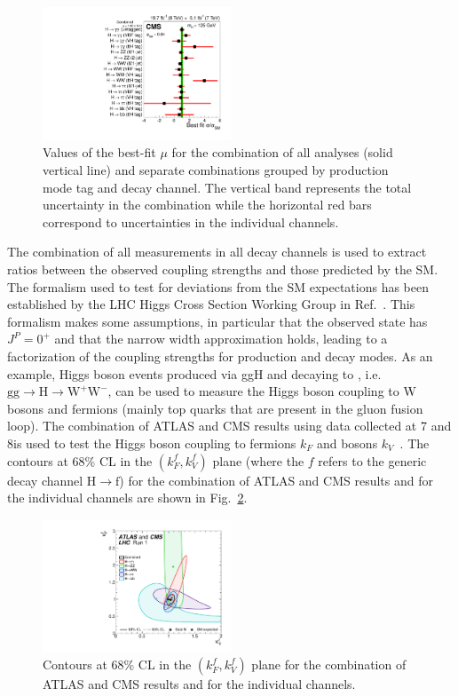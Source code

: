 \begin{figure}[htb]
\centering
\includegraphics[width=0.5\textwidth]{images/signal_strengths.pdf}
\caption{Values of the best-fit $\mu$ for the combination of all analyses (solid vertical line) and separate combinations grouped by production mode tag and decay channel. The vertical band represents the total uncertainty in the combination while the horizontal red bars correspond to uncertainties in the individual channels.}\label{fig:signal_strengths}
\end{figure}

The combination of all measurements in all decay channels is used to extract ratios between the observed coupling strengths and those predicted by the SM. The formalism used to test for deviations from the SM expectations has been established by the LHC Higgs Cross Section Working Group in Ref.~\cite{Heinemeyer:2013tqa}. This formalism makes some assumptions, in particular that the observed state has $J^P =0^+$ and that the narrow width approximation holds, leading to a factorization of the coupling strengths for production and decay modes. As an example, Higgs boson events produced via ggH and decaying to \WW, i.e. $\mathrm{gg\to H\to W^+W^-}$, can be used to measure the Higgs boson coupling to W bosons and fermions (mainly top quarks that are present in the gluon fusion loop). The combination of ATLAS and CMS results using data collected at 7 and 8\TeV is used to test the Higgs boson coupling to fermions $k_F$ and bosons $k_V$~\cite{Khachatryan:2016vau}. The contours at 68\% CL in the $(k_F^f, k_V^f)$ plane (where the $f$ refers to the generic decay channel $\mathrm{H\to f}$) for the combination of ATLAS and CMS results and for the individual channels are shown in Fig.~\ref{fig:couplings}.

\begin{figure}[htb]
\centering
\includegraphics[width=0.5\textwidth]{images/couplings.pdf}
\caption{Contours at 68\% CL in the $(k_F^f, k_V^f)$ plane for the combination of ATLAS and CMS results and for the individual channels.}\label{fig:couplings}
\end{figure}

